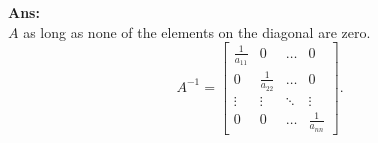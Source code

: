 \documentclass[12pt,a4paper]{amsart}
\newcommand\sol[1]{
\medskip
\begin{mdframed}
\textbf{Ans:\\} #1
\end{mdframed}
\medskip
}
\begin{document}
\begin{enumerate}
 \sol{
  $A$ as long as none of the elements on the diagonal are zero.
  \[ A^{-1} = \left[\begin{matrix} \frac{1}{a_{11}} & 0 &  \dots & 0 \\ 0 & \frac{1}{a_{22}} & \dots & 0 \\ \vdots & \vdots & \ddots & \vdots \\
  0 & 0 & \dots & \frac{1}{a_{nn}} \end{matrix}\right]. \]
 }

\end{enumerate}
\end{document}
